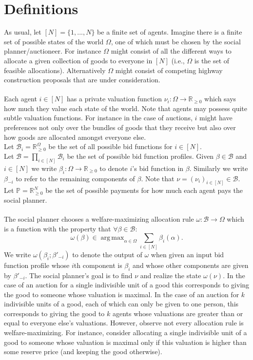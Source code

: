 \documentclass[11pt]{article}
\title{}
\date{}
\DeclareMathOperator*{\argmax}{arg\,max}
\theoremstyle{definition}
\theoremstyle{plain}
\begin{document}
\section{Definitions}

As usual, let $[N]=\{1,...,N\}$ be a finite set of agents. Imagine there is a finite set of possible states of the world $\Omega$, one of which must be chosen by the social planner/auctioneer. For instance $\Omega$ might consist of all the different ways to allocate a given collection of goods to everyone in $[N]$ (i.e., $\Omega$ is the set of feasible allocations). Alternatively $\Omega$ might consist of competing highway construction proposals that are under consideration.
\\    
\\
Each agent $i \in [N]$ has a private valuation function $\nu_i: \Omega \to \mathbb{R}_{\geq 0}$ which says how much they value each state of the world. Note that agents may possess  quite subtle valuation functions. For instance in the case of auctions, $i$ might have preferences not only over the bundles of goods that they receive but also over how goods are allocated amongst everyone else.
\\
Let $\mathcal{B}_i=\mathbb{R}_{\geq 0}^{\Omega}$ be the set of all possible bid functions for $i \in [N]$.
\\
Let $\mathcal{B}=\prod_{i \in [N]} \mathcal{B}_i$ be the set of possible bid function profiles. Given $\beta \in \mathcal{B}$ and $i \in [N]$ we write $\beta_i: \Omega \to \mathbb{R}_{\geq 0}$ to denote $i$'s bid function in $\beta$. Similarly we write $\beta_{-i}$ to refer to the remaining components of $\beta$. Note that $\nu =(\nu_i)_{i \in [N]}\in \mathcal{B}$.
\\
Let $\mathbb{P}=\mathbb{R}_{\geq 0}^N$ be the set of possible payments for how much each agent pays the social planner.
\\
\\
The social planner chooses a welfare-maximizing allocation rule $\omega: \mathcal{B} \to \Omega$ which is a function with the property that $\forall \beta \in \mathcal{B}$:
$$\omega(\beta)\in \argmax_{\alpha \in \Omega} \sum_{i \in [N]} \beta_i(\alpha).$$
We write $\omega(\beta_i;\beta'_{-i})$ to denote the output of $\omega$ when given an input bid function profile whose $i$th component is $\beta_i$ and whose other components are given by $\beta'_{-i}$. The social planner's goal is to find $\nu$ and realize the state $\omega(\nu)$. In the case of an auction for a single indivisible unit of a good this corresponds to giving the good to someone whose valuation is maximal. In the case of an auction for $k$ indivisible units of a good, each of which can only be given to one person, this corresponds to giving the good to $k$ agents whose valuations are greater than or equal to everyone else's valuations. However, observe  not every allocation rule is welfare-maximizing. For instance, consider allocating a single indivisible unit of a good to someone whose valuation is maximal only if this valuation is higher than some reserve price (and keeping the good otherwise). 
\end{document}
